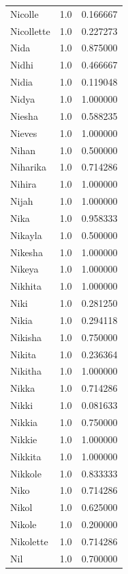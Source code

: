\documentclass[
  letterpaper,
  DIV=11,
  numbers=noendperiod]{scrreprt}
\begin{document}
\begin{tabular}{lrr}
Nicolle         &   1.0 &   0.166667 \\
Nicollette      &   1.0 &   0.227273 \\
Nida            &   1.0 &   0.875000 \\
Nidhi           &   1.0 &   0.466667 \\
Nidia           &   1.0 &   0.119048 \\
Nidya           &   1.0 &   1.000000 \\
Niesha          &   1.0 &   0.588235 \\
Nieves          &   1.0 &   1.000000 \\
Nihan           &   1.0 &   0.500000 \\
Niharika        &   1.0 &   0.714286 \\
Nihira          &   1.0 &   1.000000 \\
Nijah           &   1.0 &   1.000000 \\
Nika            &   1.0 &   0.958333 \\
Nikayla         &   1.0 &   0.500000 \\
Nikesha         &   1.0 &   1.000000 \\
Nikeya          &   1.0 &   1.000000 \\
Nikhita         &   1.0 &   1.000000 \\
Niki            &   1.0 &   0.281250 \\
Nikia           &   1.0 &   0.294118 \\
Nikisha         &   1.0 &   0.750000 \\
Nikita          &   1.0 &   0.236364 \\
Nikitha         &   1.0 &   1.000000 \\
Nikka           &   1.0 &   0.714286 \\
Nikki           &   1.0 &   0.081633 \\
Nikkia          &   1.0 &   0.750000 \\
Nikkie          &   1.0 &   1.000000 \\
Nikkita         &   1.0 &   1.000000 \\
Nikkole         &   1.0 &   0.833333 \\
Niko            &   1.0 &   0.714286 \\
Nikol           &   1.0 &   0.625000 \\
Nikole          &   1.0 &   0.200000 \\
Nikolette       &   1.0 &   0.714286 \\
Nil             &   1.0 &   0.700000 \\

\end{tabular}
\end{document}
